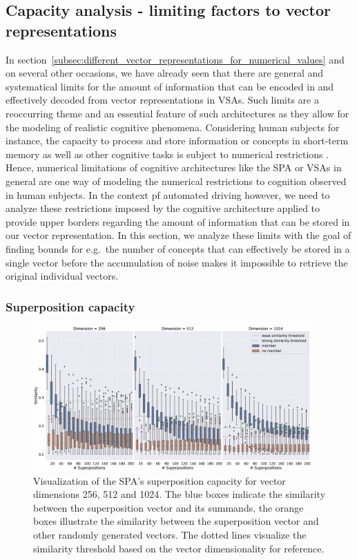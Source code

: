 \subsection{Capacity analysis - limiting factors to vector representations}%
\label{subsec:capacity_analysis_limitations_to_vector_representations}

In section~\ref{subsec:different_vector_representations_for_numerical_values} and on several other occasions, we have already seen that there are general and systematical limits for the amount of information that can be encoded in and effectively decoded from vector representations in \acp{VSA}.
Such limits are a reoccurring theme and an essential feature of such architectures as they allow for the modeling of realistic cognitive phenomena.
Considering human subjects for instance, the capacity to process and store information or concepts in short-term memory as well as other cognitive tasks is subject to numerical restrictions \parencite{Miller1956}.
Hence, numerical limitations of cognitive architectures like the \ac{SPA} or \acp{VSA} in general are one way of modeling the numerical restrictions to cognition observed in human subjects.
In the context pf automated driving however, we need to analyze these restrictions imposed by the cognitive architecture applied to provide upper borders regarding the amount of information that can be stored in our vector representation.
In this section, we analyze these limits with the goal of finding bounds for e.g.\ the number of concepts that can effectively be stored in a single vector before the accumulation of noise makes it impossible to retrieve the original individual vectors.

\subsubsection{Superposition capacity}%
\label{ssubsec:superposition_capacity}

\begin{figure}[t]
	\centering
	\includegraphics[width=0.95\textwidth]{imgs/spa_superposition_capacity.eps}
	\caption{Visualization of the \ac{SPA}'s superposition capacity for vector dimensions \num{256}, \num{512} and \num{1024}.
    The blue boxes indicate the similarity between the superposition vector and its summands, the orange boxes illustrate the similarity between the superposition vector and other randomly generated vectors.
    The dotted lines visualize the similarity threshold based on the vector dimensionality for reference.}
	\label{fig:spa_superposition_capacity}
\end{figure}

